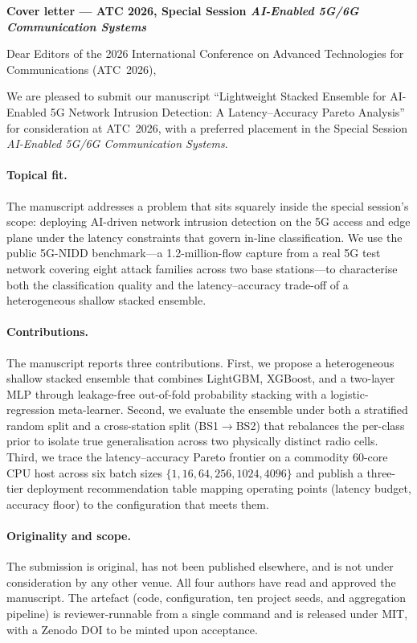 \documentclass[11pt,a4paper]{article}
\begin{document}
\noindent
\textbf{Cover letter --- ATC 2026, Special Session \textit{AI-Enabled 5G/6G Communication Systems}}

\bigskip
\noindent
Dear Editors of the 2026 International Conference on Advanced Technologies
for Communications (ATC~2026),

\bigskip

We are pleased to submit our manuscript ``Lightweight Stacked Ensemble for
AI-Enabled 5G Network Intrusion Detection: A Latency--Accuracy Pareto
Analysis'' for consideration at ATC~2026, with a preferred placement in
the Special Session \emph{AI-Enabled 5G/6G Communication Systems}.

\paragraph{Topical fit.} The manuscript addresses a problem that sits
squarely inside the special session's scope: deploying AI-driven network
intrusion detection on the 5G access and edge plane under the latency
constraints that govern in-line classification. We use the public
5G-NIDD benchmark---a 1.2-million-flow capture from a real 5G test
network covering eight attack families across two base stations---to
characterise both the classification quality and the latency--accuracy
trade-off of a heterogeneous shallow stacked ensemble.

\paragraph{Contributions.} The manuscript reports three contributions.
First, we propose a heterogeneous shallow stacked ensemble that combines
LightGBM, XGBoost, and a two-layer MLP through leakage-free out-of-fold
probability stacking with a logistic-regression meta-learner. Second, we
evaluate the ensemble under both a stratified random split and a
cross-station split (BS1$\rightarrow$BS2) that rebalances the
per-class prior to isolate true generalisation across two physically
distinct radio cells. Third, we trace the latency--accuracy Pareto
frontier on a commodity 60-core CPU host across six batch sizes
$\{1, 16, 64, 256, 1024, 4096\}$ and publish a three-tier deployment
recommendation table mapping operating points (latency budget, accuracy
floor) to the configuration that meets them.

\paragraph{Originality and scope.} The submission is original, has not
been published elsewhere, and is not under consideration by any other
venue. All four authors have read and approved the manuscript. The
artefact (code, configuration, ten project seeds, and aggregation
pipeline) is reviewer-runnable from a single command and is released
under MIT, with a Zenodo DOI to be minted upon acceptance.
\end{document}
